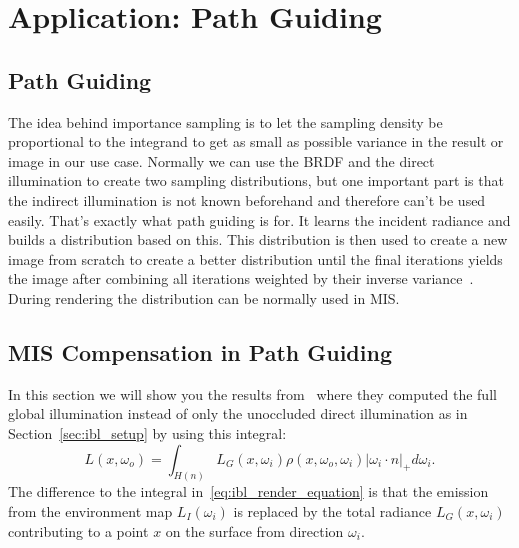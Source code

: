 \chapter{Application: Path Guiding}
\label{ch:application_pg}


\section{Path Guiding}
\label{sec:path_guiding}
The idea behind importance sampling is to let the sampling density be proportional to the integrand
to get as small as possible variance in the result or image in our use case.
Normally we can use the BRDF and the direct illumination to create two sampling distributions,
but one important part is that the indirect illumination is not known beforehand and therefore can't be used easily.
That's exactly what path guiding is for.
It learns the incident radiance and builds a distribution based on this.
This distribution is then used to create a new image from scratch to create a better distribution
until the final iterations yields the image after combining all iterations weighted by their inverse variance~\cite{Vorba_2019}.
During rendering the distribution can be normally used in MIS.



\section{MIS Compensation in Path Guiding}
\label{sec:misc_path_guiding}
In this section we will show you the results from~\cite[Section~8-9]{Karlik2019}
where they computed the full global illumination instead of only the unoccluded direct illumination as in Section~\ref{sec:ibl_setup} by using this integral:
$$ L(x, \omega_o) = \int_{H(n)} L_G(x, \omega_i)\rho(x, \omega_o, \omega_i) |\omega_i \cdot n|_+ d\omega_i. $$
The difference to the integral in~\ref{eq:ibl_render_equation} is that the emission from the environment map $ L_I(\omega_i) $
is replaced by the total radiance $ L_G(x, \omega_i) $ contributing to a point $ x $ on the surface from direction $ \omega_i $.

